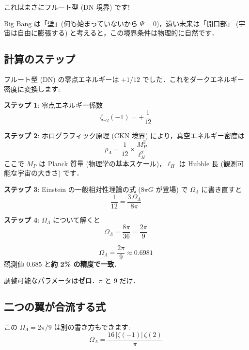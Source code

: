 \documentclass[11pt,a4paper]{article}
\begin{document}
これはまさにフルート型 (DN 境界) です!

Big Bang は「壁」(何も始まっていないから $\Psi = 0$)，遠い未来は「開口部」
(宇宙は自由に膨張する) と考えると，この境界条件は物理的に自然です．

\subsection{計算のステップ}

フルート型 (DN) の零点エネルギーは $+1/12$ でした．これをダークエネルギー
密度に変換します:

\textbf{ステップ 1}: 零点エネルギー係数
\begin{equation*}
\zeta_{\neg 2}(-1) = +\frac{1}{12}
\end{equation*}

\textbf{ステップ 2}: ホログラフィック原理 (CKN 境界) により，真空エネルギー密度は
\begin{equation*}
\rho_\Lambda = \frac{1}{12} \times \frac{M_P^2}{\ell_H^2}
\end{equation*}
ここで $M_P$ は Planck 質量 (物理学の基本スケール)，$\ell_H$ は Hubble 長
(観測可能な宇宙の大きさ) です．

\textbf{ステップ 3}: Einstein の一般相対性理論の式 ($8\pi G$ が登場) で
$\Omega_\Lambda$ に書き直すと
\begin{equation*}
\frac{1}{12} = \frac{3\,\Omega_\Lambda}{8\pi}
\end{equation*}

\textbf{ステップ 4}: $\Omega_\Lambda$ について解くと
\begin{equation*}
\Omega_\Lambda = \frac{8\pi}{36} = \frac{2\pi}{9}
\end{equation*}

\begin{tcolorbox}[colback=green!5,colframe=green!60!black,title=結果]
\begin{equation*}
\boxed{\Omega_\Lambda = \frac{2\pi}{9} \approx 0.6981}
\end{equation*}
観測値 $0.685$ と\textbf{約 2\% の精度で一致}．

調整可能なパラメータは\textbf{ゼロ}．$\pi$ と $9$ だけ．
\end{tcolorbox}

\subsection{二つの翼が合流する式}

この $\Omega_\Lambda = 2\pi/9$ は別の書き方もできます:
\begin{equation*}
\Omega_\Lambda = \frac{16\,|\zeta(-1)|\,\zeta(2)}{\pi}
\end{equation*}
\end{document}
